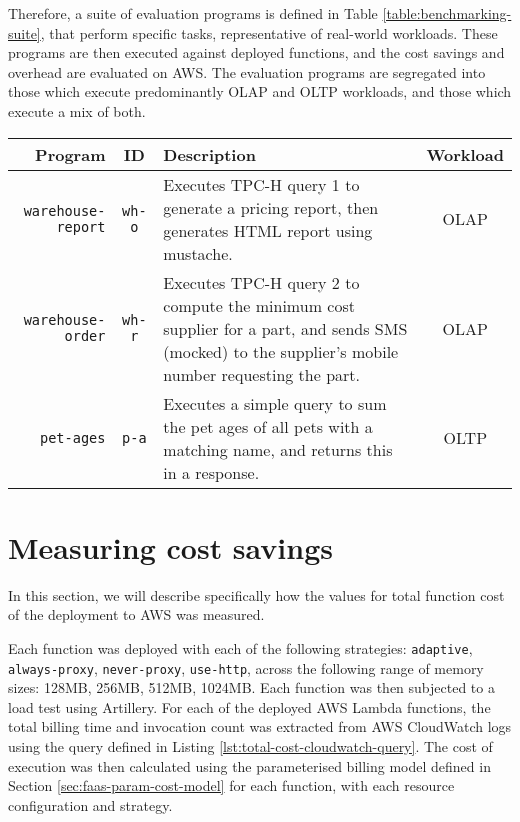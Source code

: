 Therefore, a suite of evaluation programs is defined in Table \ref{table:benchmarking-suite}, that perform specific tasks, representative of real-world workloads. These programs are then executed against deployed \faaas{} functions, and the cost savings and overhead are evaluated on AWS. The evaluation programs are segregated into those which execute predominantly OLAP and OLTP workloads, and those which execute a mix of both.

\begin{table*}
\begin{tabularx}{\linewidth}{|r|c|X|c|}
    \hline
    \textbf{Program} & \textbf{ID} & \textbf{Description} & \textbf{Workload} \\
    \hline
    \verb|warehouse-report| & \verb|wh-o| & Executes TPC-H query 1 to generate a pricing report, then generates HTML report using mustache. & OLAP \\
    \hline
    \verb|warehouse-order| & \verb|wh-r| & Executes TPC-H query 2 to compute the minimum cost supplier for a part, and sends SMS (mocked) to the supplier's mobile number requesting the part.  & OLAP \\
    \hline
    \verb|pet-ages| & \verb|p-a| & Executes a simple query to sum the pet ages of all pets with a matching name, and returns this in a response. & OLTP \\
    \hline
\end{tabularx}
\caption{Suite of benchmarking programs used to evaluate \faaas{}}
\label{table:benchmarking-suite}
\end{table*}

\section{Measuring cost savings}
In this section, we will describe specifically how the values for total function cost of the \faaas{} deployment to AWS was measured.

Each function was deployed with each of the following strategies: \verb|adaptive|, \verb|always-proxy|, \verb|never-proxy|, \verb|use-http|, across the following range of memory sizes: 128MB, 256MB, 512MB, 1024MB. Each function was then subjected to a load test using Artillery\cite{artilleryArtilleryCloudscaleLoad}. For each of the deployed AWS Lambda functions, the total billing time and invocation count was extracted from AWS CloudWatch logs using the query defined in Listing \ref{lst:total-cost-cloudwatch-query}. The cost of execution was then calculated using the parameterised billing model defined in Section \ref{sec:faas-param-cost-model} for each function, with each resource configuration and strategy.


